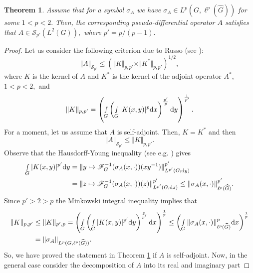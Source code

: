 \documentclass[12pt, reqno]{amsart}
\newtheorem{theorem}{Theorem}[section]
\theoremstyle{definition}
\theoremstyle{remark}
\numberwithin{equation}{section}
\begin{document}
\begin{theorem}\label{Michael:Criterion}
    Assume that for a symbol $\sigma_A$ we have  $\sigma_A\in L^p(G,\ell^p(\widehat{G}))$ for some $1<p<2.$ Then, the corresponding pseudo-differential operator $A$ satisfies that $A\in \mathscr{S}_{p'}(L^2(G)),$ where $p'=p/(p-1).$
\end{theorem}
\begin{proof}
    Let us consider the following criterion due to Russo (see \cite{Russo77}):
    \begin{equation}
        \Vert A\Vert_{\mathscr{S}_{p'}}\leq (\Vert K \Vert_{p,p'}\times \Vert K^{*} \Vert_{p,p'})^{1/2},
    \end{equation}where $K$ is the kernel of $A$ and $K^*$ is the kernel of the adjoint operator $A^*,$ $1<p<2,$ and 
\begin{equation}
    \Vert K\Vert_{p,p'}=\left(\smallint\limits_{G} \left( \smallint\limits_{G}|K(x,y)|^p\textnormal{d}x      \right)^{\frac{p'}{p}}\textnormal{d}y\right)^{\frac{1}{p'}}.
\end{equation}   
For a moment, let us assume that $A$ is self-adjoint. Then, $K=K^*$ and then
\begin{equation}
        \Vert A\Vert_{\mathscr{S}_{p'}}\leq \Vert K \Vert_{p,p'}.
    \end{equation}
Observe that the Hausdorff-Young inequality (see e.g. \cite[Page 69]{FischerRuzhanskyBook}) gives
\begin{align*} \smallint\limits_{G}|K(x,y)|^{p'}\textnormal{d}y &=\Vert y\mapsto \mathscr{F}_{G}^{-1}(\sigma_A(x,\cdot))(xy^{-1})\Vert_{L^{p'}(G;\textnormal{d}y)}^{p'}\\
&=\Vert z\mapsto \mathscr{F}_{G}^{-1}(\sigma_A(x,\cdot))(z)\Vert_{L^{p'}(G;\textnormal{d}z)}^{p'}\leq \Vert \sigma_A(x,\cdot)\Vert_{\ell^{p}(\widehat{G})}^{p'}.     
\end{align*}
Since $p'>2>p$ the Minkowski integral inequality implies that
\begin{align*}
    \Vert K\Vert_{p,p'} &\leq \Vert K\Vert_{p',p}=\left(\smallint\limits_{G} \left( \smallint\limits_{G}|K(x,y)|^{p'}\textnormal{d}y      \right)^{\frac{p}{p'}}\textnormal{d}x\right)^{\frac{1}{p}}\leq \left(\smallint\limits_{G}      \Vert \sigma_A(x,\cdot)\Vert_{\ell^{p}(\widehat{G})}^{p}\textnormal{d}x\right)^{\frac{1}{p}}\\
    &=\Vert\sigma_A\Vert_{L^p(G,\ell^{p}(\widehat{G}))}.
\end{align*} So, we have proved the statement in  Theorem \ref{Michael:Criterion} if $A$ is self-adjoint. Now, in the general case consider the decomposition of $A$ into its real and imaginary part

\end{proof}
\end{document}
